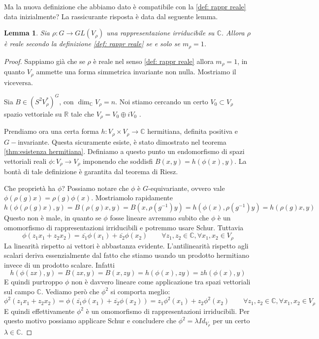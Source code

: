 \documentclass[11pt]{article}
\theoremstyle{plain}
\newtheorem{lemma}[thm]{Lemma}
\theoremstyle{definition}
\theoremstyle{remark}
\newcommand{\C}{\mathbb{C}}
\newcommand{\R}{\mathbb{R}}
\begin{document}
Ma la nuova definizione che abbiamo dato è compatibile con la \ref{def: rappr reale} data inizialmente?
La rassicurante risposta è data dal seguente lemma.
\begin{lemma}
Sia $\rho:G\to GL(V_\rho)$ una rappresentazione irriducibile su $\C$. Allora $\rho$ è reale secondo la definizione \ref{def: rappr reale} se e solo se $m_\rho = 1$.
\end{lemma}
\begin{proof}
Sappiamo già che se $\rho$ è reale nel senso \ref{def: rappr reale} allora $m_\rho = 1$, in quanto $V_\rho$ ammette una forma simmetrica invariante non nulla. Mostriamo il viceversa.

Sia $B \in (S^2V_\rho^*)^G$, con $\dim_\C V_\rho = n$.
Noi stiamo cercando un certo $V_0 \subset V_\rho$ spazio vettoriale su $\R$ tale che $V_\rho = V_0 \oplus i V_0$ .

Prendiamo ora una certa forma $h : V_\rho \times V_\rho \to \C$ hermitiana, definita positiva e $G-$invariante. Questa sicuramente esiste, è stato dimostrato nel teorema \ref{thm:esistenza hermitiana}.
Definiamo a questo punto un endomorfismo di spazi vettoriali reali $\phi: V_\rho \to V_\rho$ imponendo che soddisfi $B(x, y) = h(\phi(x), y)$.
La bontà di tale definizione è garantita dal teorema di Riesz.

Che proprietà ha $\phi$? Possiamo notare che $\phi$ è $G$-equivariante, ovvero vale $\phi(\rho(g)x) = \rho(g) \phi(x)$.
Mostriamolo rapidamente
\[ h(\phi(\rho(g)x) , y) = B(\rho(g)x, y) = B(x, \rho(g^{-1} ) y) = h (\phi(x), \rho(g^{-1} ) y) = h(\rho(g)x, y)\]
Questo non è male, in quanto se $\phi$ fosse lineare avremmo subito che $\phi$ è un omomorfismo di rappresentazioni irriducibili e potremmo usare Schur. Tuttavia
\[ \phi(z_1 x_1 + z_2 x_2) = \overline{z_1} \phi(x_1) + \overline{z_2} \phi(x_2) \qquad \forall z_1, z_2 \in \C, \forall x_1, x_2 \in V_\rho\]
La linearità rispetto ai vettori è abbastanza evidente. L'antilinearità rispetto agli scalari deriva essenzialmente dal fatto che stiamo usando un prodotto hermitiano invece di un prodotto scalare. Infatti
\[ h( \phi(zx) , y) = B(zx, y) = B(x, zy) = h(\phi(x), zy) = \overline{z} h(\phi(x), y) \]
E quindi purtroppo $\phi$ non è davvero lineare come applicazione tra spazi vettoriali sul campo $\C$. Vediamo però che $\phi^2$ si comporta meglio:
\[\phi^2(z_1 x_1 + z_2 x_2) = \phi(\overline{z_1} \phi(x_1) + \overline{z_2} \phi(x_2))  = z_1 \phi^2(x_1) + z_2 \phi^2(x_2) \qquad \forall z_1, z_2 \in \C, \forall x_1, x_2 \in V_\rho \] 
E quindi effettivamente $\phi^2$ è un omomorfismo di rappresentazioni irriducibili. Per questo motivo possiamo applicare Schur e concludere che 
$\phi^ 2 = \lambda Id_{V_\rho}$ per un certo $\lambda \in \C$.


\end{proof}
\end{document}
